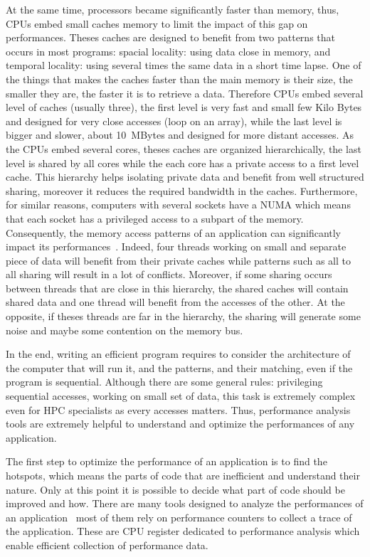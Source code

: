 At the same time, processors became significantly faster than memory, thus, \glspl{CPU} embed small caches memory to limit the impact of this gap on performances.
Theses caches are designed to benefit from two patterns that occurs in most programs: spacial locality: using data close in memory, and temporal locality: using several times the same data in a short time lapse.
One of the things that makes the caches faster than the main memory is their size, the smaller they are, the faster it is to retrieve a data.
Therefore \glspl{CPU} embed several level of caches (usually three), the first level is very fast and small few Kilo Bytes and designed for very close accesses (loop on an array), while the  last level is bigger and slower, about \SI{10}{MBytes} and designed for more distant accesses.
As the \glspl{CPU} embed several cores, theses caches are organized hierarchically, the last level is shared by all cores while the each core has a private access to a first level cache.
This hierarchy helps isolating private data and benefit from well structured sharing, moreover it reduces the required bandwidth in the caches.
Furthermore, for similar reasons, computers with several sockets have a \gls{NUMA} which means that each socket has a privileged access to a subpart of the memory.
Consequently, the memory access patterns of an application can significantly impact its performances~\cite{Drepper07What}.
Indeed, four threads working on small and separate piece of data will benefit from their private caches while patterns such as all to all sharing will result in a lot of conflicts.
Moreover, if some sharing occurs between threads that are close in this hierarchy, the shared caches will contain shared data and one thread will benefit from the accesses of the other.
At the opposite, if theses threads are far in the hierarchy, the sharing will generate some noise and maybe some contention on the memory bus.

In the end, writing an efficient program requires to consider the architecture of the computer that will run it, and the patterns, and their matching, even if the program is sequential.
Although there are some general rules: privileging sequential accesses, working on small set of data, this task is extremely complex even for \gls{HPC} specialists as every accesses matters.
Thus, performance analysis tools are extremely helpful to understand and optimize the performances of any application.

The first step to optimize the performance of an application is to find the hotspots, which means the parts of code that are inefficient and understand their nature.
Only at this point it is possible to decide what part of code should be improved and how.
There are many tools designed to analyze the performances of an application~\cite{Pillet95PARAVER,Browne00Portable,Shende06Tau,Treibig10LIKWID,Adhianto10HPCTOOLKIT} most of them rely on performance counters to collect a trace of the application.
These are \gls{CPU} register dedicated to performance analysis which enable efficient collection of performance data.

